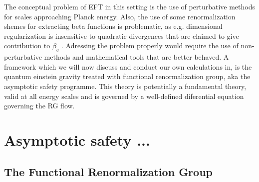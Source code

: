 \documentclass[11pt, a4paper]{article}
\begin{document}
The conceptual problem of EFT in this setting is the use of perturbative methods for scales approaching Planck energy.
Also, the use of some renormalization shemes for extracting beta functions is problematic, as e.g. dimensional regularization is insensitive to quadratic
divergences that are claimed to give contribution to $\beta_g$ \cite{absence}.
Adressing the problem properly would require the use of non-perturbative methods and mathematical tools that are better behaved.
A framework which we will now discuss and conduct our own calculations in, is the quantum einstein gravity treated with functional renormalization group, aka the asymptotic safety programme.
This theory is potentially a fundamental theory, valid at all energy scales \cite{qeg} and is governed by a well-defined diferential equation governing the RG flow.




\section{Asymptotic safety ...}

\subsection{The Functional Renormalization Group}
\end{document}
